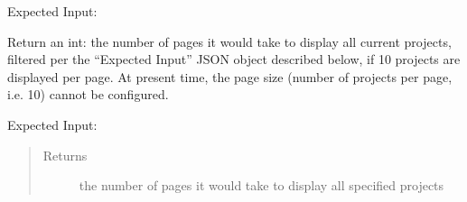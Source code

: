 \documentclass[letterpaper,10pt,english]{sphinxmanual}
\begin{document}
\begin{fulllineitems}
\begin{fulllineitems}
Expected Input:

\begin{sphinxVerbatim}[commandchars=\\\{\}]
     
\end{sphinxVerbatim}

\end{fulllineitems}


\begin{fulllineitems}
\label{\detokenize{apidoc/utdesign_procurement:utdesign_procurement.apigateway.ApiGateway.projectPages}}
Return an int: the number of pages it would take to
display all current projects, filtered per the “Expected Input” JSON
object described below, if 10 projects are displayed
per page. At present time, the page size (number of
projects per page, i.e. 10) cannot be configured.

Expected Input:

\begin{sphinxVerbatim}[commandchars=\\\{\}]
     
      
      
      
      
\end{sphinxVerbatim}
\begin{quote}\begin{description}
\item[{Returns}] \leavevmode
the number of pages it would take to display all specified projects


\end{description}
\end{quote}
\end{fulllineitems}
\end{fulllineitems}
\end{document}

